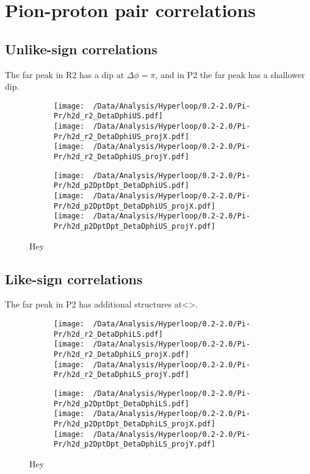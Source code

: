 \documentclass[12pt,a4paper,twoside]{report}
\begin{document}
\section{Pion-proton pair correlations}
\subsection{Unlike-sign correlations}
The far peak in R2 has a dip at $\Delta\phi=\pi$, and in P2 the far peak has a shallower dip.
\begin{figure}[H]
	\begin{subfigure}{0.49\linewidth}
		\texttt{[image: ~/Data/Analysis/Hyperloop/0.2-2.0/Pi-Pr/h2d\_r2\_DetaDphiUS.pdf]}\\
		\texttt{[image: ~/Data/Analysis/Hyperloop/0.2-2.0/Pi-Pr/h2d\_r2\_DetaDphiUS\_projX.pdf]}\\
		\texttt{[image: ~/Data/Analysis/Hyperloop/0.2-2.0/Pi-Pr/h2d\_r2\_DetaDphiUS\_projY.pdf]}\\
	\end{subfigure}
	\begin{subfigure}{0.49\linewidth}
		\texttt{[image: ~/Data/Analysis/Hyperloop/0.2-2.0/Pi-Pr/h2d\_p2DptDpt\_DetaDphiUS.pdf]}\\
		\texttt{[image: ~/Data/Analysis/Hyperloop/0.2-2.0/Pi-Pr/h2d\_p2DptDpt\_DetaDphiUS\_projX.pdf]}\\
		\texttt{[image: ~/Data/Analysis/Hyperloop/0.2-2.0/Pi-Pr/h2d\_p2DptDpt\_DetaDphiUS\_projY.pdf]}\\
	\end{subfigure}
	\caption{Hey}
\end{figure}
\subsection{Like-sign correlations}
The far peak in P2 has additional structures at<>.
\begin{figure}[H]
	\begin{subfigure}{0.49\linewidth}
		\texttt{[image: ~/Data/Analysis/Hyperloop/0.2-2.0/Pi-Pr/h2d\_r2\_DetaDphiLS.pdf]}\\
		\texttt{[image: ~/Data/Analysis/Hyperloop/0.2-2.0/Pi-Pr/h2d\_r2\_DetaDphiLS\_projX.pdf]}\\
		\texttt{[image: ~/Data/Analysis/Hyperloop/0.2-2.0/Pi-Pr/h2d\_r2\_DetaDphiLS\_projY.pdf]}\\
	\end{subfigure}
	\begin{subfigure}{0.49\linewidth}
		\texttt{[image: ~/Data/Analysis/Hyperloop/0.2-2.0/Pi-Pr/h2d\_p2DptDpt\_DetaDphiLS.pdf]}\\
		\texttt{[image: ~/Data/Analysis/Hyperloop/0.2-2.0/Pi-Pr/h2d\_p2DptDpt\_DetaDphiLS\_projX.pdf]}\\
		\texttt{[image: ~/Data/Analysis/Hyperloop/0.2-2.0/Pi-Pr/h2d\_p2DptDpt\_DetaDphiLS\_projY.pdf]}\\
	\end{subfigure}
	\caption{Hey}
\end{figure}
\end{document}
